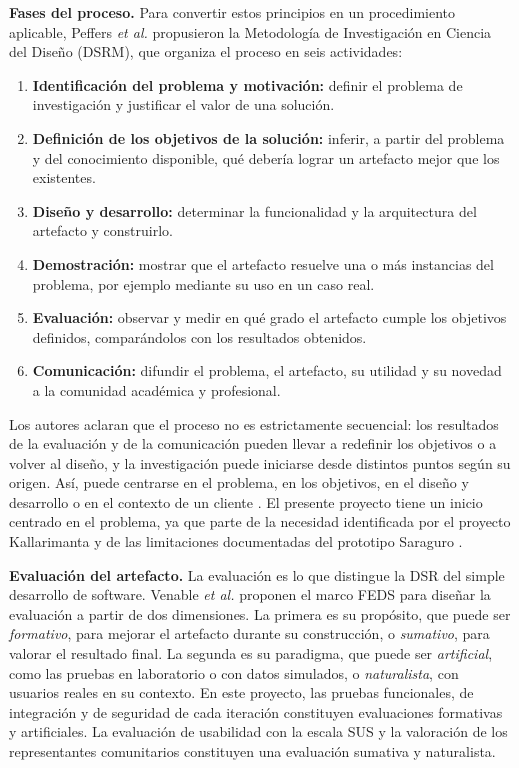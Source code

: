 \textbf{Fases del proceso.} Para convertir estos principios en un procedimiento aplicable, Peffers \textit{et al.} \cite{peffers2007dsrm} propusieron la Metodología de Investigación en Ciencia del Diseño (DSRM), que organiza el proceso en seis actividades:

\begin{enumerate}
  \item \textbf{Identificación del problema y motivación:} definir el problema de investigación y justificar el valor de una solución.
  \item \textbf{Definición de los objetivos de la solución:} inferir, a partir del problema y del conocimiento disponible, qué debería lograr un artefacto mejor que los existentes.
  \item \textbf{Diseño y desarrollo:} determinar la funcionalidad y la arquitectura del artefacto y construirlo.
  \item \textbf{Demostración:} mostrar que el artefacto resuelve una o más instancias del problema, por ejemplo mediante su uso en un caso real.
  \item \textbf{Evaluación:} observar y medir en qué grado el artefacto cumple los objetivos definidos, comparándolos con los resultados obtenidos.
  \item \textbf{Comunicación:} difundir el problema, el artefacto, su utilidad y su novedad a la comunidad académica y profesional.
\end{enumerate}

Los autores aclaran que el proceso no es estrictamente secuencial: los resultados de la evaluación y de la comunicación pueden llevar a redefinir los objetivos o a volver al diseño, y la investigación puede iniciarse desde distintos puntos según su origen. Así, puede centrarse en el problema, en los objetivos, en el diseño y desarrollo o en el contexto de un cliente \cite{peffers2007dsrm}. El presente proyecto tiene un inicio centrado en el problema, ya que parte de la necesidad identificada por el proyecto Kallarimanta y de las limitaciones documentadas del prototipo Saraguro \cite{quezada2026mobile}.

\textbf{Evaluación del artefacto.} La evaluación es lo que distingue la DSR del simple desarrollo de software. Venable \textit{et al.} \cite{venable2016feds} proponen el marco FEDS para diseñar la evaluación a partir de dos dimensiones. La primera es su propósito, que puede ser \textit{formativo}, para mejorar el artefacto durante su construcción, o \textit{sumativo}, para valorar el resultado final. La segunda es su paradigma, que puede ser \textit{artificial}, como las pruebas en laboratorio o con datos simulados, o \textit{naturalista}, con usuarios reales en su contexto. En este proyecto, las pruebas funcionales, de integración y de seguridad de cada iteración constituyen evaluaciones formativas y artificiales. La evaluación de usabilidad con la escala SUS y la valoración de los representantes comunitarios constituyen una evaluación sumativa y naturalista.

